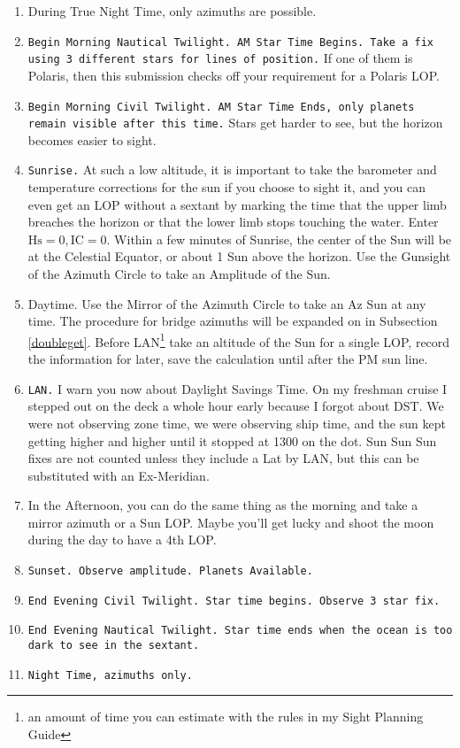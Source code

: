 \documentclass[letterpaper,12pt]{article}
\begin{document}
\begin{enumerate}
\item During True Night Time, only azimuths are possible.
    \item \texttt{Begin Morning Nautical Twilight. AM Star Time Begins. Take a fix using 3 different stars for lines of position.} If one of them is Polaris, then this submission checks off your requirement for a Polaris LOP.
    \item \texttt{Begin Morning Civil Twilight. AM Star Time Ends, only planets remain visible after this time.} Stars get harder to see, but the horizon becomes easier to sight.
    \item \texttt{Sunrise.} At such a low altitude, it is important to take the barometer and temperature corrections for the sun if you choose to sight it, and you can even get an LOP without a sextant by marking the time that the upper limb breaches the horizon or that the lower limb stops touching the water. Enter \(\text{Hs}=0, \text{IC}=0\). Within a few minutes of Sunrise, the center of the Sun will be at the Celestial Equator, or about 1 Sun above the horizon. Use the Gunsight of the Azimuth Circle to take an Amplitude of the Sun.
    \item Daytime. Use the Mirror of the Azimuth Circle to take an Az Sun at any time. The procedure for bridge azimuths will be expanded on in Subsection \ref{doubleget}. Before LAN\footnote{an amount of time you can estimate with the rules in my Sight Planning Guide} take an altitude of the Sun for a single LOP, record the information for later, save the calculation until after the PM sun line.
    \item \texttt{LAN.} I warn you now about Daylight Savings Time. On my freshman cruise I stepped out on the deck a whole hour early because I forgot about DST.
	    We were not observing zone time, we were observing ship time, and the sun kept getting higher and higher until it stopped at 1300 on the dot.
	    Sun Sun Sun fixes are not counted unless they include a Lat by LAN, but this can be substituted with an Ex-Meridian.
    \item In the Afternoon, you can do the same thing as the morning and take a mirror azimuth or a Sun LOP.
	    Maybe you'll get lucky and shoot the moon during the day to have a 4th LOP.
    \item \texttt{Sunset. Observe amplitude. Planets Available.}
    \item \texttt{End Evening Civil Twilight. Star time begins. Observe 3 star fix.}
    \item \texttt{End Evening Nautical Twilight. Star time ends when the ocean is too dark to see in the sextant.} 
    \item \texttt{Night Time, azimuths only.}
\end{enumerate}
\end{document}
